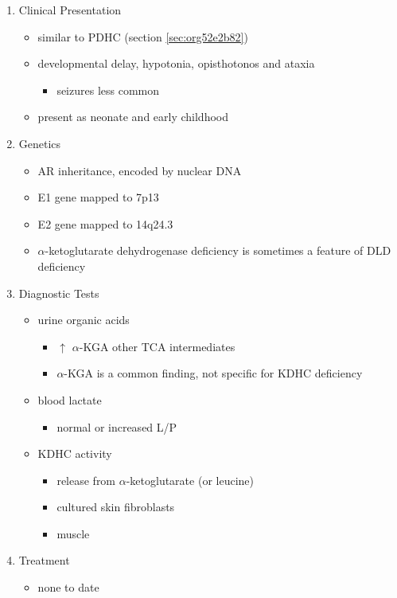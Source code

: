 \documentclass{scrartcl}
\begin{document}
\begin{enumerate}
\item Clinical Presentation
\label{sec:org12846eb}
\begin{itemize}
\item similar to PDHC (section \ref{sec:org52e2b82})
\item developmental delay, hypotonia, opisthotonos and ataxia
\begin{itemize}
\item seizures less common
\end{itemize}
\item present as neonate and early childhood
\end{itemize}

\item Genetics
\label{sec:org474f94f}
\begin{itemize}
\item AR inheritance, encoded by nuclear DNA
\item E1 gene mapped to 7p13
\item E2 gene mapped to 14q24.3
\item \(\alpha\)-ketoglutarate dehydrogenase deficiency is sometimes a feature of DLD deficiency
\end{itemize}

\item Diagnostic Tests
\label{sec:org1d885d2}
\begin{itemize}
\item urine organic acids
\begin{itemize}
\item \(\uparrow\) \(\alpha\)-KGA \textpm{} other TCA intermediates
\item \(\alpha\)-KGA is a common finding, not specific for KDHC deficiency
\end{itemize}
\item blood lactate
\begin{itemize}
\item normal or increased L/P
\end{itemize}
\item KDHC activity
\begin{itemize}
\item {} release from \ce{[1-^14C]} \(\alpha\)-ketoglutarate (or \ce{[1-^14C]} leucine)
\item cultured skin fibroblasts
\item muscle
\end{itemize}
\end{itemize}

\item Treatment
\label{sec:org5b5fc87}
\begin{itemize}
\item none to date
\end{itemize}
\end{enumerate}
\end{document}

